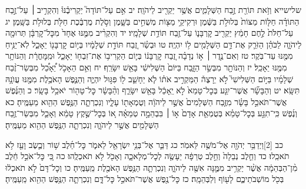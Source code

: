 \documentclass[twoside, openany, parskip=half, 11pt]{book}
\begin{document}
שלישייא וְזֹ֥את תּוֹרַ֖ת זֶ֣בַח הַשְּׁלָמִ֑ים אֲשֶׁ֥ר יַקְרִ֖יב לַיהֹוָֽה׃ יב אִ֣ם עַל־תּוֹדָה֮ יַקְרִיבֶ֒נּוּ֒ וְהִקְרִ֣יב ׀ עַל־זֶ֣בַח הַתּוֹדָ֗ה חַלּ֤וֹת מַצּוֹת֙ בְּלוּלֹ֣ת בַּשֶּׁ֔מֶן וּרְקִיקֵ֥י מַצּ֖וֹת מְשֻׁחִ֣ים בַּשָּׁ֑מֶן וְסֹ֣לֶת מֻרְבֶּ֔כֶת חַלֹּ֖ת בְּלוּלֹ֥ת בַּשָּֽׁמֶן׃ יג עַל־חַלֹּת֙ לֶ֣חֶם חָמֵ֔ץ יַקְרִ֖יב קׇרְבָּנ֑וֹ עַל־זֶ֖בַח תּוֹדַ֥ת שְׁלָמָֽיו׃ יד וְהִקְרִ֨יב מִמֶּ֤נּוּ אֶחָד֙ מִכׇּל־קׇרְבָּ֔ן תְּרוּמָ֖ה לַיהֹוָ֑ה לַכֹּהֵ֗ן הַזֹּרֵ֛ק אֶת־דַּ֥ם הַשְּׁלָמִ֖ים ל֥וֹ יִהְיֶֽה׃ טו וּבְשַׂ֗ר זֶ֚בַח תּוֹדַ֣ת שְׁלָמָ֔יו בְּי֥וֹם קׇרְבָּנ֖וֹ יֵאָכֵ֑ל לֹֽא־יַנִּ֥יחַ מִמֶּ֖נּוּ עַד־בֹּֽקֶר׃ טז וְאִם־נֶ֣דֶר ׀ א֣וֹ נְדָבָ֗ה זֶ֚בַח קׇרְבָּנ֔וֹ בְּי֛וֹם הַקְרִיב֥וֹ אֶת־זִבְח֖וֹ יֵאָכֵ֑ל וּמִֽמׇּחֳרָ֔ת וְהַנּוֹתָ֥ר מִמֶּ֖נּוּ יֵאָכֵֽל׃ יז וְהַנּוֹתָ֖ר מִבְּשַׂ֣ר הַזָּ֑בַח בַּיּוֹם֙ הַשְּׁלִישִׁ֔י בָּאֵ֖שׁ יִשָּׂרֵֽף׃ יח וְאִ֣ם הֵאָכֹ֣ל יֵ֠אָכֵ֠ל מִבְּשַׂר־זֶ֨בַח שְׁלָמָ֜יו בַּיּ֣וֹם הַשְּׁלִישִׁי֮ לֹ֣א יֵרָצֶה֒ הַמַּקְרִ֣יב אֹת֗וֹ לֹ֧א יֵחָשֵׁ֛ב ל֖וֹ פִּגּ֣וּל יִהְיֶ֑ה וְהַנֶּ֛פֶשׁ הָאֹכֶ֥לֶת מִמֶּ֖נּוּ עֲוֺנָ֥הּ תִּשָּֽׂא׃ יט וְהַבָּשָׂ֞ר אֲשֶׁר־יִגַּ֤ע בְּכׇל־טָמֵא֙ לֹ֣א יֵֽאָכֵ֔ל בָּאֵ֖שׁ יִשָּׂרֵ֑ף וְהַ֨בָּשָׂ֔ר כׇּל־טָה֖וֹר יֹאכַ֥ל בָּשָֽׂר׃ כ וְהַנֶּ֜פֶשׁ אֲשֶׁר־תֹּאכַ֣ל בָּשָׂ֗ר מִזֶּ֤בַח הַשְּׁלָמִים֙ אֲשֶׁ֣ר לַיהֹוָ֔ה וְטֻמְאָת֖וֹ עָלָ֑יו וְנִכְרְתָ֛ה הַנֶּ֥פֶשׁ הַהִ֖וא מֵעַמֶּֽיהָ׃ כא וְנֶ֜פֶשׁ כִּֽי־תִגַּ֣ע בְּכׇל־טָמֵ֗א בְּטֻמְאַ֤ת אָדָם֙ א֣וֹ ׀ בִּבְהֵמָ֣ה טְמֵאָ֗ה א֚וֹ בְּכׇל־שֶׁ֣קֶץ טָמֵ֔א וְאָכַ֛ל מִבְּשַׂר־זֶ֥בַח הַשְּׁלָמִ֖ים אֲשֶׁ֣ר לַיהֹוָ֑ה וְנִכְרְתָ֛ה הַנֶּ֥פֶשׁ הַהִ֖וא מֵעַמֶּֽיהָ׃

כב ‏[2]וַיְדַבֵּ֥ר יְהֹוָ֖ה אֶל־מֹשֶׁ֥ה לֵּאמֹֽר׃ כג דַּבֵּ֛ר אֶל־בְּנֵ֥י יִשְׂרָאֵ֖ל לֵאמֹ֑ר כׇּל־חֵ֜לֶב שׁ֥וֹר וְכֶ֛שֶׂב וָעֵ֖ז לֹ֥א תֹאכֵֽלוּ׃ כד וְחֵ֤לֶב נְבֵלָה֙ וְחֵ֣לֶב טְרֵפָ֔ה יֵעָשֶׂ֖ה לְכׇל־מְלָאכָ֑ה וְאָכֹ֖ל לֹ֥א תֹאכְלֻֽהוּ׃ כה כִּ֚י כׇּל־אֹכֵ֣ל חֵ֔לֶב מִ֨ן־הַבְּהֵמָ֔ה אֲשֶׁ֨ר יַקְרִ֥יב מִמֶּ֛נָּה אִשֶּׁ֖ה לַיהֹוָ֑ה וְנִכְרְתָ֛ה הַנֶּ֥פֶשׁ הָאֹכֶ֖לֶת מֵֽעַמֶּֽיהָ׃ כו וְכׇל־דָּם֙ לֹ֣א תֹאכְל֔וּ בְּכֹ֖ל מוֹשְׁבֹתֵיכֶ֑ם לָע֖וֹף וְלַבְּהֵמָֽה׃ כז כׇּל־נֶ֖פֶשׁ אֲשֶׁר־תֹּאכַ֣ל כׇּל־דָּ֑ם וְנִכְרְתָ֛ה הַנֶּ֥פֶשׁ הַהִ֖וא מֵֽעַמֶּֽיהָ׃
\end{document}

